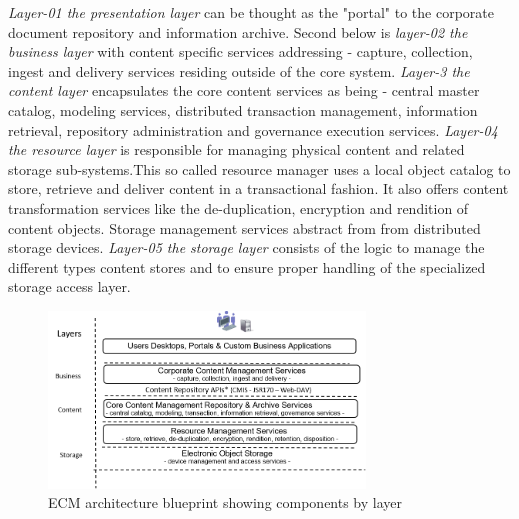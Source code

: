 \documentclass[EPiC]{easychair} %
\begin{document}
    \noindent  \textit{Layer-01 the presentation layer} can be thought as the "portal" to the corporate document repository and information archive. Second below is \textit{layer-02 the business layer} with content specific services addressing - capture, collection, ingest and delivery services residing outside of the core system. \textit{Layer-3 the content layer} encapsulates the core content services as being - central master catalog, modeling services, distributed transaction management, information retrieval, repository administration and governance execution services. \textit{Layer-04 the resource layer} is responsible for managing physical content and related storage sub-systems.This so called resource  manager uses a local object catalog to store, retrieve and deliver content in a transactional fashion. It also offers content transformation services like the de-duplication, encryption and rendition of content objects. Storage management services abstract from from distributed storage devices. \textit{Layer-05 the storage layer} consists of the logic to manage the different types content stores and to ensure  proper handling of the specialized storage access layer. \\
    
\begin{figure}[hbt!]
	\begin{centering}
	\includegraphics[width=0.75\textwidth]{pics/ECMPic04c.png}
	\caption{ECM architecture blueprint showing components by layer}
	\label{fig:architecture-blueprint}
	\end{centering}
\end{figure}
\end{document}
